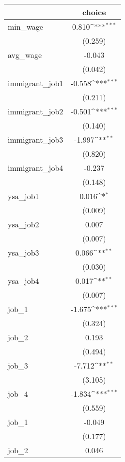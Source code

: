 {
\def\sym#1{\ifmmode^{#1}\else\(^{#1}\)\fi}
\begin{tabular}{l*{1}{c}}
\hline\hline
            &\multicolumn{1}{c}{choice}\\
\hline
min\_wage    &       0.810\sym{***}\\
            &     (0.259)         \\
avg\_wage    &      -0.043         \\
            &     (0.042)         \\
immigrant\_job1&      -0.558\sym{***}\\
            &     (0.211)         \\
immigrant\_job2&      -0.501\sym{***}\\
            &     (0.140)         \\
immigrant\_job3&      -1.997\sym{**} \\
            &     (0.820)         \\
immigrant\_job4&      -0.237         \\
            &     (0.148)         \\
ysa\_job1    &       0.016\sym{*}  \\
            &     (0.009)         \\
ysa\_job2    &       0.007         \\
            &     (0.007)         \\
ysa\_job3    &       0.066\sym{**} \\
            &     (0.030)         \\
ysa\_job4    &       0.017\sym{**} \\
            &     (0.007)         \\
job\_1       &      -1.675\sym{***}\\
            &     (0.324)         \\
job\_2       &       0.193         \\
            &     (0.494)         \\
job\_3       &      -7.712\sym{**} \\
            &     (3.105)         \\
job\_4       &      -1.834\sym{***}\\
            &     (0.559)         \\
job\_1       &      -0.049         \\
            &     (0.177)         \\
job\_2       &       0.046         \\

\end{tabular}}
